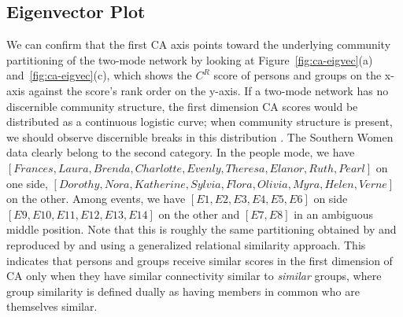 \documentclass[a4paper,fleqn]{cas-sc}
\begin{document}
\subsection{Eigenvector Plot} \label{subsec:eigplot}
We can confirm that the first CA axis points toward the underlying community partitioning of the two-mode network by looking at Figure~\ref{fig:ca-eigvec}(a) and~\ref{fig:ca-eigvec}(c), which shows the $C^R$ score of persons and groups on the x-axis against the score's rank order on the y-axis. If a two-mode network has no discernible community structure, the first dimension CA scores would be distributed as a continuous logistic curve; when community structure is present, we should observe discernible breaks in this distribution \citep{van2021correspondence}. The Southern Women data clearly belong to the second category. In the people mode, we have $\left[Frances, Laura, Brenda, Charlotte, Evenly, Theresa, Elanor, Ruth, Pearl\right]$ on one side, $\left[Dorothy, Nora, Katherine, Sylvia, Flora, Olivia, Myra, Helen, Verne\right]$ on the other. Among events, we have $\left[E1, E2, E3, E4, E5, E6\right]$ on side $\left[E9, E10, E11, E12, E13, E14\right]$ on the other and $\left[E7, E8\right]$ in an ambiguous middle position. Note that this is roughly the same partitioning obtained by \citep{doreian2004generalized} and reproduced by \citet{kovacs2010generalized} and \citet{lizardo2024two} using a generalized relational similarity approach. This indicates that persons and groups receive similar scores in the first dimension of CA only when they have similar connectivity similar to \textit{similar} groups, where group similarity is defined dually as having members in common who are themselves similar. 
\end{document}
